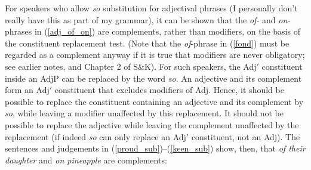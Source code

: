 \documentclass{article}
\begin{document}
For speakers who allow \emph{so} substitution for adjectival phrases (I personally don't really have this as part of my grammar), it can be shown that the \emph{of-} and \emph{on-}phrases in (\ref{adj_of_on}) are complements, rather than modifiers, on the basis of the constituent replacement test.
(Note that the \emph{of}-phrase in (\ref{fond}) must be regarded as a complement anyway if it is true that modifiers are never obligatory; see earlier notes, and Chapter 2 of S\&K).
For such speakers, the Adj$'$ constituent inside an AdjP can be replaced by the word \emph{so}.
An adjective and its complement form an Adj$'$ constituent that excludes modifiers of Adj.
Hence, it should be possible to replace the constituent containing an adjective and its complement by \emph{so}, while leaving a modifier unaffected by this replacement.
It should not be possible to replace the adjective while leaving the complement unaffected by the replacement (if indeed \emph{so} can only replace an Adj$'$ constituent, not an Adj).
The sentences and judgements in (\ref{proud_sub})--(\ref{keen_sub}) show, then, that \emph{of their daughter} and \emph{on pineapple} are complements:
\begin{exe}
    \label{proud_sub}
    \label{keen_sub}
\end{exe}
\newpage
\end{document}
